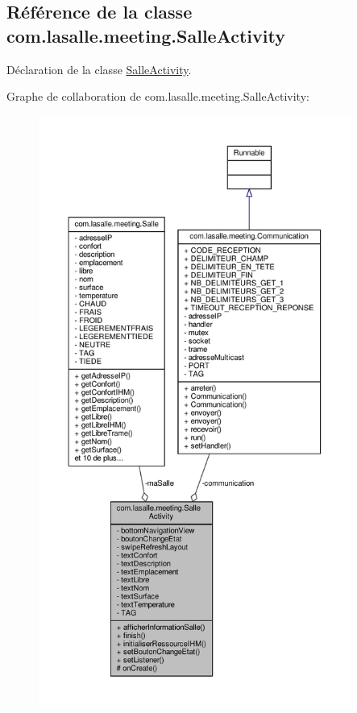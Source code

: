 \hypertarget{classcom_1_1lasalle_1_1meeting_1_1_salle_activity}{}\subsection{Référence de la classe com.\+lasalle.\+meeting.\+Salle\+Activity}
\label{classcom_1_1lasalle_1_1meeting_1_1_salle_activity}


Déclaration de la classe \hyperlink{classcom_1_1lasalle_1_1meeting_1_1_salle_activity}{Salle\+Activity}.  




Graphe de collaboration de com.\+lasalle.\+meeting.\+Salle\+Activity\+:
\nopagebreak
\begin{figure}[H]
\begin{center}
\leavevmode
\includegraphics[height=550pt]{classcom_1_1lasalle_1_1meeting_1_1_salle_activity__coll__graph}
\end{center}
\end{figure}
